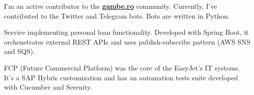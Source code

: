 \documentclass[10pt,a4paper,ragged2e]{altacv}
\begin{document}
\divider



I'm an active contributor to the \textbf{\href{http://gambe.ro}{gambe.ro}} community. Currently, I've contributed to the Twitter and Telegram bots. Bots are written in Python.

\divider

Service implementing personal loan functionality. Developed with Spring Boot, it orchenstrates external REST APIs and uses publish-subscribe pattern (AWS SNS and SQS). 

\divider

FCP (Future Commercial Platform) was the core of the EasyJet’s IT systems. It's a SAP Hybris customization and has an automation tests suite developed with Cucumber and Serenity.

\medskip

\clearpage

\end{document}
